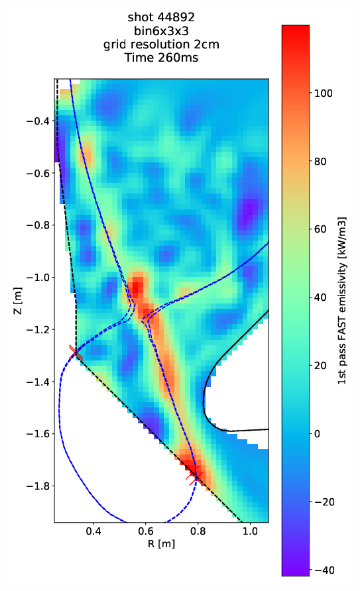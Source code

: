 \begin{figure}
\begin{subfigure}{0.2\textwidth}
         \includegraphics[trim={70 0 25 0},clip,width=\textwidth]{Chapters/chapter2/figs/44892_2.png}
         \label{fig:44892_2}
     \end{subfigure}
     \hfill
     \begin{subfigure}{0.2\textwidth}
         \centering

\end{subfigure}
\end{figure}
